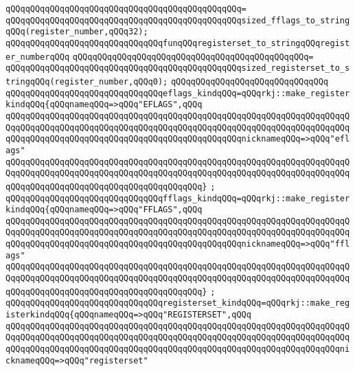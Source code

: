 \verb|qQQqqQQqqQQqqQQqqQQqqQQqqQQqqQQqqQQqqQQqqQQqqQQq=|\newline
\verb|qQQqqQQqqQQqqQQqqQQqqQQqqQQqqQQqqQQqqQQqqQQqqQQqsized_fflags_to_stringqQQq(register_number,qQQq32);|\newline
\newline
\verb|qQQqqQQqqQQqqQQqqQQqqQQqqQQqqQQqfunqQQqregisterset_to_stringqQQqregister_numberqQQq|\newline
\verb|qQQqqQQqqQQqqQQqqQQqqQQqqQQqqQQqqQQqqQQqqQQqqQQq=|\newline
\verb|qQQqqQQqqQQqqQQqqQQqqQQqqQQqqQQqqQQqqQQqqQQqqQQqsized_registerset_to_stringqQQq(register_number,qQQq0);|\newline
\verb|qQQqqQQqqQQqqQQqqQQqqQQqqQQqqQQq|\newline
\verb|qQQqqQQqqQQqqQQqqQQqqQQqqQQqqQQqeflags_kindqQQq=qQQqrkj::make_registerkindqQQq{qQQqnameqQQq=>qQQq"EFLAGS",qQQq|\newline
\verb|qQQqqQQqqQQqqQQqqQQqqQQqqQQqqQQqqQQqqQQqqQQqqQQqqQQqqQQqqQQqqQQqqQQqqQQqqQQqqQQqqQQqqQQqqQQqqQQqqQQqqQQqqQQqqQQqqQQqqQQqqQQqqQQqqQQqqQQqqQQqqQQqqQQqqQQqqQQqqQQqqQQqqQQqqQQqqQQqqQQqqQQqqQQqnicknameqQQq=>qQQq"eflags"|\newline
\verb|qQQqqQQqqQQqqQQqqQQqqQQqqQQqqQQqqQQqqQQqqQQqqQQqqQQqqQQqqQQqqQQqqQQqqQQqqQQqqQQqqQQqqQQqqQQqqQQqqQQqqQQqqQQqqQQqqQQqqQQqqQQqqQQqqQQqqQQqqQQqqQQqqQQqqQQqqQQqqQQqqQQqqQQqqQQqqQQqqQQq}|\newline
\verb|;|\newline
\verb|qQQqqQQqqQQqqQQqqQQqqQQqqQQqqQQqfflags_kindqQQq=qQQqrkj::make_registerkindqQQq{qQQqnameqQQq=>qQQq"FFLAGS",qQQq|\newline
\verb|qQQqqQQqqQQqqQQqqQQqqQQqqQQqqQQqqQQqqQQqqQQqqQQqqQQqqQQqqQQqqQQqqQQqqQQqqQQqqQQqqQQqqQQqqQQqqQQqqQQqqQQqqQQqqQQqqQQqqQQqqQQqqQQqqQQqqQQqqQQqqQQqqQQqqQQqqQQqqQQqqQQqqQQqqQQqqQQqqQQqqQQqqQQqnicknameqQQq=>qQQq"fflags"|\newline
\verb|qQQqqQQqqQQqqQQqqQQqqQQqqQQqqQQqqQQqqQQqqQQqqQQqqQQqqQQqqQQqqQQqqQQqqQQqqQQqqQQqqQQqqQQqqQQqqQQqqQQqqQQqqQQqqQQqqQQqqQQqqQQqqQQqqQQqqQQqqQQqqQQqqQQqqQQqqQQqqQQqqQQqqQQqqQQqqQQqqQQq}|\newline
\verb|;|\newline
\verb|qQQqqQQqqQQqqQQqqQQqqQQqqQQqqQQqregisterset_kindqQQq=qQQqrkj::make_registerkindqQQq{qQQqnameqQQq=>qQQq"REGISTERSET",qQQq|\newline
\verb|qQQqqQQqqQQqqQQqqQQqqQQqqQQqqQQqqQQqqQQqqQQqqQQqqQQqqQQqqQQqqQQqqQQqqQQqqQQqqQQqqQQqqQQqqQQqqQQqqQQqqQQqqQQqqQQqqQQqqQQqqQQqqQQqqQQqqQQqqQQqqQQqqQQqqQQqqQQqqQQqqQQqqQQqqQQqqQQqqQQqqQQqqQQqqQQqqQQqqQQqqQQqqQQqnicknameqQQq=>qQQq"registerset"|\newline
